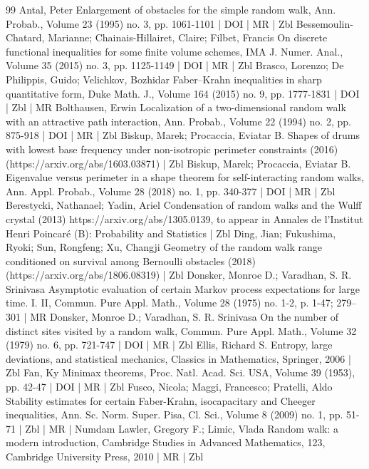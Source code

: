 \begin{thebibliography}{99}
Antal, Peter Enlargement of obstacles for the simple random walk, Ann. Probab., Volume 23 (1995) no. 3, pp. 1061-1101 | DOI | MR | Zbl
Bessemoulin-Chatard, Marianne; Chainais-Hillairet, Claire; Filbet, Francis On discrete functional inequalities for some finite volume schemes, IMA J. Numer. Anal., Volume 35 (2015) no. 3, pp. 1125-1149 | DOI | MR | Zbl
Brasco, Lorenzo; De Philippis, Guido; Velichkov, Bozhidar Faber–Krahn inequalities in sharp quantitative form, Duke Math. J., Volume 164 (2015) no. 9, pp. 1777-1831 | DOI | Zbl | MR
Bolthausen, Erwin Localization of a two-dimensional random walk with an attractive path interaction, Ann. Probab., Volume 22 (1994) no. 2, pp. 875-918 | DOI | MR | Zbl
Biskup, Marek; Procaccia, Eviatar B. Shapes of drums with lowest base frequency under non-isotropic perimeter constraints (2016) (https://arxiv.org/abs/1603.03871) | Zbl
Biskup, Marek; Procaccia, Eviatar B. Eigenvalue versus perimeter in a shape theorem for self-interacting random walks, Ann. Appl. Probab., Volume 28 (2018) no. 1, pp. 340-377 | DOI | MR | Zbl
Berestycki, Nathanael; Yadin, Ariel Condensation of random walks and the Wulff crystal (2013) https://arxiv.org/abs/1305.0139, to appear in Annales de l’Institut Henri Poincaré (B): Probability and Statistics | Zbl
Ding, Jian; Fukushima, Ryoki; Sun, Rongfeng; Xu, Changji Geometry of the random walk range conditioned on survival among Bernoulli obstacles (2018) (https://arxiv.org/abs/1806.08319) | Zbl
Donsker, Monroe D.; Varadhan, S. R. Srinivasa Asymptotic evaluation of certain Markov process expectations for large time. I. II, Commun. Pure Appl. Math., Volume 28 (1975) no. 1-2, p. 1-47; 279–301 | MR
Donsker, Monroe D.; Varadhan, S. R. Srinivasa On the number of distinct sites visited by a random walk, Commun. Pure Appl. Math., Volume 32 (1979) no. 6, pp. 721-747 | DOI | MR | Zbl
Ellis, Richard S. Entropy, large deviations, and statistical mechanics, Classics in Mathematics, Springer, 2006 | Zbl
Fan, Ky Minimax theorems, Proc. Natl. Acad. Sci. USA, Volume 39 (1953), pp. 42-47 | DOI | MR | Zbl
Fusco, Nicola; Maggi, Francesco; Pratelli, Aldo Stability estimates for certain Faber-Krahn, isocapacitary and Cheeger inequalities, Ann. Sc. Norm. Super. Pisa, Cl. Sci., Volume 8 (2009) no. 1, pp. 51-71 | Zbl | MR | Numdam
Lawler, Gregory F.; Limic, Vlada Random walk: a modern introduction, Cambridge Studies in Advanced Mathematics, 123, Cambridge University Press, 2010 | MR | Zbl

\end{thebibliography}
